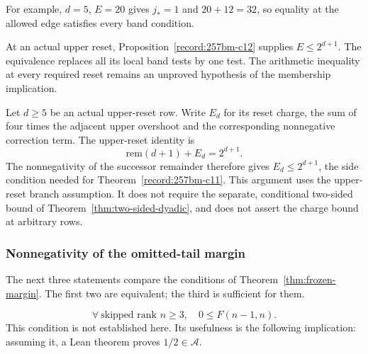 For example, $d=5$, $E=20$ gives $j_*=1$ and
$20+12=32$, so equality at the allowed edge satisfies every band condition.

At an actual upper reset, Proposition~\ref{record:257bm-c12}
supplies $E\le2^{d+1}$.  The equivalence replaces all its local
band tests by one test.  The arithmetic inequality at every required
reset remains an unproved hypothesis of the membership implication.

\begin{prop}\label{record:257bm-c12}
Let $d\ge5$ be an actual upper-reset row.  Write $E_d$ for its
reset charge, the sum of four times the adjacent upper overshoot and
the corresponding nonnegative correction term.  The upper-reset identity is
\[
 \mathrm{rem}(d+1)+E_d=2^{d+1}.
\]
The nonnegativity of the successor remainder therefore gives
$E_d\le2^{d+1}$, the side condition needed for
Theorem~\ref{record:257bm-c11}.  This argument uses the upper-reset
branch assumption.  It does not require the separate, conditional
two-sided bound of Theorem~\ref{thm:two-sided-dyadic}, and does not
assert the charge bound at arbitrary rows.
\end{prop}

\subsubsection*{Nonnegativity of the omitted-tail margin}

The next three statements compare the conditions of
Theorem~\ref{thm:frozen-margin}.  The first two are equivalent; the third
is sufficient for them.

\begin{defn}\label{record:257bm-c13}
\[
\forall\ \text{skipped rank } n\ge3,\quad 0 \le \ensuremath{F}(n-1,n).
\]
This condition is not established here.  Its usefulness is the following implication:
assuming it, a Lean theorem proves
$1/2\in\ensuremath{\mathcal A}$.
\par\noindent   {} 
\end{defn}

